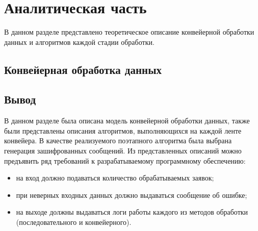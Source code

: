\chapter{Аналитическая часть}

В данном разделе представлено теоретическое описание конвейерной обработки
данных и алгоритмов каждой стадии обработки.

\section{Конвейерная обработка данных}


\section{Вывод}

В данном разделе была описана модель конвейерной обработки данных, также были
представлены описания алгоритмов, выполняющихся на каждой ленте конвейера. В
качестве реализуемого поэтапного алгоритма была выбрана генерация зашифрованных
сообщений.  Из представленных описаний можно предъявить ряд требований к
разрабатываемому программному обеспечению:
\begin{itemize}[left=\parindent]
    \item на вход должно подаваться количество обрабатываемых заявок;
    \item при неверных входных данных должно выдаваться сообщение об ошибке;
    \item на выходе должны выдаваться логи работы каждого из методов обработки
        (последовательного и конвейерного).
\end{itemize}
